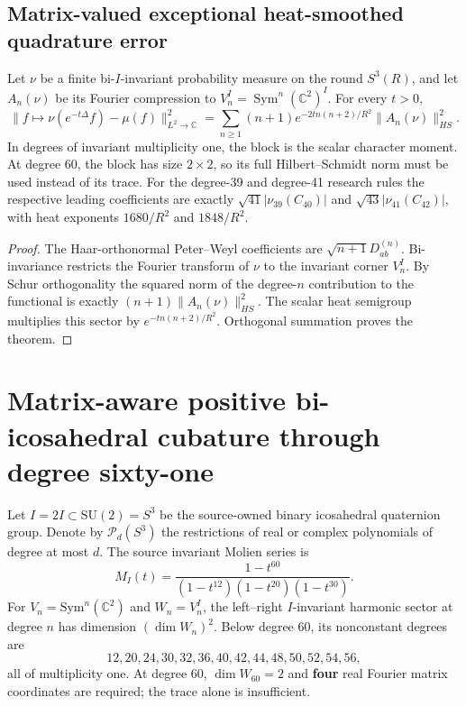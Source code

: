 \documentclass[11pt]{article}
\begin{document}
\subsection{Matrix-valued exceptional heat-smoothed quadrature error}
\label{p1b:sec:cc111-matrix-heat}
\begin{theorem}
\label{p1b:thm:cc111-matrix-heat}
Let $\nu$ be a finite bi-$I$-invariant probability measure on the round
$S^3(R)$, and let $A_n(\nu)$ be its Fourier compression to
$V_n^I=\operatorname{Sym}^n(\mathbb C^2)^I$. For every $t>0$,
\[
\boxed{\|f\mapsto \nu(e^{-t\Delta}f)-\mu(f)\|_{L^2\to\mathbb C}^2
=\sum_{n\ge1}(n+1)e^{-2tn(n+2)/R^2}\|A_n(\nu)\|_{HS}^2.}
\]
In degrees of invariant multiplicity one, the block is the scalar
character moment. At degree $60$, the block has size $2\times2$, so
its full Hilbert--Schmidt norm must be used instead of its trace.
For the degree-39 and degree-41 research rules the respective leading
coefficients are exactly $\sqrt{41}|\nu_{39}(C_{40})|$ and
$\sqrt{43}|\nu_{41}(C_{42})|$, with heat exponents $1680/R^2$ and
$1848/R^2$.
\end{theorem}
\begin{proof}
The Haar-orthonormal Peter--Weyl coefficients are
$\sqrt{n+1}D^{(n)}_{ab}$. Bi-invariance restricts the Fourier
transform of $\nu$ to the invariant corner $V_n^I$.
By Schur orthogonality the squared norm of the degree-$n$ contribution
to the functional is exactly $(n+1)\|A_n(\nu)\|_{HS}^2$.
The scalar heat semigroup multiplies this sector by
$e^{-tn(n+2)/R^2}$. Orthogonal summation proves the theorem.
\end{proof}


\section{Matrix-aware positive bi-icosahedral cubature through degree sixty-one}
\label{p1b:sec:cc112-positive-degree61}

Let $I=2I\subset \mathrm{SU}(2)=S^3$ be the source-owned binary
icosahedral quaternion group.  Denote by $\mathcal P_d(S^3)$ the
restrictions of real or complex polynomials of degree at most $d$.
The source invariant Molien series is
\[
 M_I(t)=\frac{1-t^{60}}{(1-t^{12})(1-t^{20})(1-t^{30})}.
\]
For $V_n=\mathrm{Sym}^n(\mathbb C^2)$ and $W_n=V_n^I$, the left--right
$I$-invariant harmonic sector at degree $n$ has dimension
$(\dim W_n)^2$.  Below degree $60$, its nonconstant degrees are
\[
 12,20,24,30,32,36,40,42,44,48,50,52,54,56,
\]
all of multiplicity one. At degree $60$, $\dim W_{60}=2$ and \textbf{four} real Fourier matrix
coordinates are required; the trace alone is insufficient.
\end{document}
